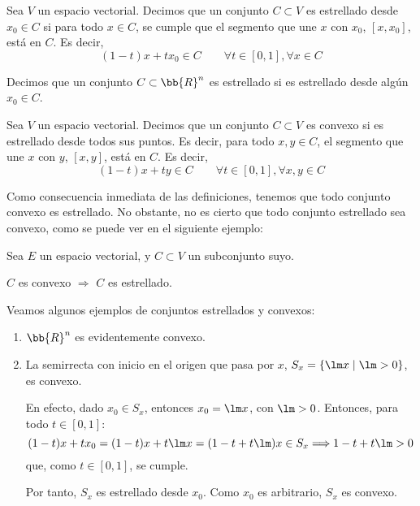 \begin{definicion}
    Sea $V$ un espacio vectorial.
    Decimos que un conjunto $C\subset V$ es estrellado desde $x_0\in C$ si para todo $x\in C$, se cumple que el segmento que une $x$ con $x_0$, $[x,x_0]$, está en $C$. Es decir,
    \begin{equation*}
        (1-t)x + tx_0 \in C  \qquad \forall t\in [0,1],\forall x\in C
    \end{equation*}

    Decimos que un conjunto $C\subset \bb{R}^n$ es estrellado si es estrellado desde algún $x_0\in C$.
\end{definicion}
\begin{definicion}
    Sea $V$ un espacio vectorial.
    Decimos que un conjunto $C\subset V$ es convexo si es estrellado desde todos sus puntos. Es decir, para todo $x,y\in C$, el segmento que une $x$ con $y$, $[x,y]$, está en $C$. Es decir,
    \begin{equation*}
        (1-t)x + ty \in C  \qquad \forall t\in [0,1],\forall x,y\in C
    \end{equation*}
\end{definicion}
Como consecuencia inmediata de las definiciones, tenemos que todo conjunto convexo es estrellado. No obstante, no es cierto que todo conjunto estrellado sea convexo, como se puede ver en el siguiente ejemplo:
\begin{lema}
    Sea $E$ un espacio vectorial, y $C\subset V$ un subconjunto suyo.
    \begin{center}
        $C$ es convexo $\Longrightarrow$ $C$ es estrellado.
    \end{center}
\end{lema}

\begin{ejemplo}
    Veamos algunos ejemplos de conjuntos estrellados y convexos:
    \begin{enumerate}
        \item $\bb{R}^n$ es evidentemente convexo.
        \item La semirrecta con inicio en el origen que pasa por $x$, $S_x = \{\lm x \mid \lm > 0\}$, es convexo.
        
        En efecto, dado $x_0\in S_x$, entonces $x_0=\lm x$, con $\lm > 0$. Entonces, para todo $t\in [0,1]$:
        $$(1-t)x+tx_0=(1-t)x+t\lm x=(1-t+t\lm)x\in S_x \Longrightarrow
        1-t+t\lm > 0$$
        que, como $t\in [0,1]$, se cumple.
        
        Por tanto, $S_x$ es estrellado desde $x_0$. Como $x_0$ es arbitrario, $S_x$ es convexo.
    \end{enumerate}
\end{ejemplo}

